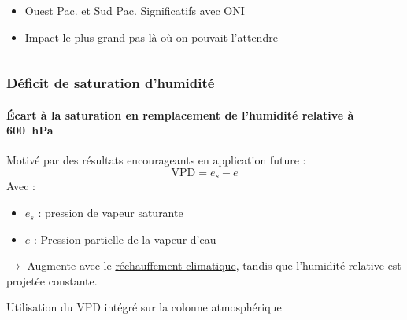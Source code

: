 \documentclass[aspectratio=169, usepdftitle=false, xcolor={dvipsnames}, 9pt,table]{beamer}
\begin{document}
\begin{frame}[t]
\begin{columns}
\begin{column}{0.2\textwidth}
\begin{block}
\begin{itemize}
                    \item Ouest Pac. et Sud Pac. Significatifs avec ONI 
                    \item Impact le plus grand pas là où on pouvait l'attendre
                \end{itemize}
            \end{block}
        \end{column}
    \end{columns}
\end{frame}

\begin{frame}
    \frametitle{Déficit de saturation d'humidité}
    \framesubtitle{Écart à la saturation en remplacement de l'humidité relative à 600~hPa}
    \small
    \begin{definition}
        \footnotesize
        Motivé par des résultats encourageants en application future \parencite{camargo_testing_2014}:\\
        \[ \text{VPD} = e_s - e \]
        Avec :
        \setlength{\leftmargini}{2.5ex}
        \begin{itemize}
            \item $e_s$ : pression de vapeur saturante
            \item $e$ : Pression partielle de la vapeur d'eau
        \end{itemize}
        $\longrightarrow$ \alert{Augmente} avec le \underline{réchauffement climatique}, tandis que l'humidité relative est projetée constante.\\
        \vspace{\baselineskip}
    \end{definition}
    \vspace{1em}
    \small
    \begin{examples}[Méthodologie]
        \footnotesize
        Utilisation du VPD intégré sur la colonne atmosphérique \parencite{camargo_testing_2014}
    \end{examples}
\end{frame}
\end{document}
